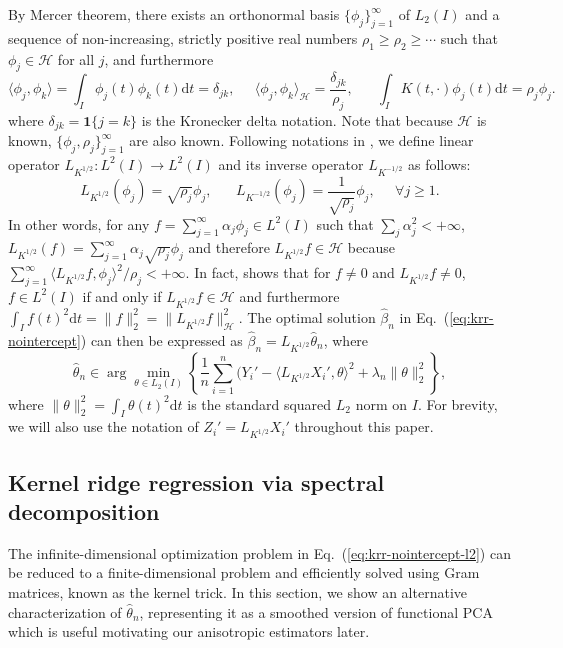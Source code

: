 \documentclass[11pt,a4paper]{article}
\renewcommand{\hat}{\widehat}
\newcommand{\vct}{\boldsymbol}
\theoremstyle{definition}
\theoremstyle{plain}
\theoremstyle{remark}
\newcommand{\ud}{\mathrm d}
\newcommand{\mH}{\mathcal H}
\begin{document}
By Mercer theorem, there exists an orthonormal basis $\{\phi_j\}_{j=1}^{\infty}$ of $L_2(I)$
and a sequence of non-increasing, strictly positive real numbers $\rho_1\geq\rho_2\geq\cdots$ such that $\phi_j\in\mH$ for all $j$, and furthermore
$$
\langle\phi_j,\phi_k\rangle = \int_I \phi_j(t)\phi_k(t)\ud t = \delta_{jk},\;\;\;\;\;\langle\phi_j,\phi_k\rangle_{\mH}= \frac{\delta_{jk}}{\rho_j},\;\;\;\;\;\;\int_I K(t,\cdot)\phi_j(t)\ud t=\rho_j\phi_j.
$$
where $\delta_{jk}=\vct 1\{j=k\}$ is the Kronecker delta notation.
Note that because $\mH$ is known, $\{\phi_j,\rho_j\}_{j=1}^{\infty}$ are also known.
Following notations in \citep{cai2012minimax}, we define linear operator $L_{K^{1/2}}:L^2(I)\to L^2(I)$ and its inverse operator $L_{K^{-1/2}}$ as follows:
$$
L_{K^{1/2}}(\phi_j) = \sqrt{\rho_j}\phi_j,\;\;\;\;\;\; L_{K^{-1/2}}(\phi_j) = \frac{1}{\sqrt{\rho_j}}\phi_j,\;\;\;\;\;\forall j\geq 1.
$$
In other words, for any $f=\sum_{j=1}^{\infty}\alpha_j\phi_j\in L^2(I)$ such that $\sum_j\alpha_j^2<+\infty$, $L_{K^{1/2}}(f)=\sum_{j=1}^{\infty}\alpha_j\sqrt{\rho_j}\phi_j$
and therefore $L_{K^{1/2}}f\in\mH$ because $\sum_{j=1}^{\infty}\langle L_{K^{1/2}}f,\phi_j\rangle^2/\rho_j <+\infty$.
In fact, \citep[Proposition 2]{yuan2010reproducing} shows that for $f\neq 0$ and $L_{K^{1/2}}f\neq 0$, $f\in L^2(I)$ if and only if $L_{K^{1/2}}f\in\mH$ and furthermore $\int_I f(t)^2\ud t=\|f\|_2^2=\|L_{K^{1/2}}f\|_\mH^2$.
The optimal solution $\hat\beta_n$ in Eq.~(\ref{eq:krr-nointercept}) can then be expressed as $\hat\beta_n = L_{K^{1/2}}\hat\theta_n$, where
\begin{equation}
\hat\theta_n \in \arg\min_{\theta\in L_2(I)}\left\{\frac{1}{n}\sum_{i=1}^n (Y_i'-\langle L_{K^{1/2}}X_i', \theta\rangle^2 + \lambda_n\|\theta\|_2^2\right\},
\label{eq:krr-nointercept-l2}
\end{equation}
where $\|\theta\|_2^2 =\int_I \theta(t)^2\ud t$ is the standard squared $L_2$ norm on $I$.
For brevity, we will also use the notation of $Z_i' = L_{K^{1/2}}X_i'$ throughout this paper.

\subsection{Kernel ridge regression via spectral decomposition}

The infinite-dimensional optimization problem in Eq.~(\ref{eq:krr-nointercept-l2}) can be reduced to a finite-dimensional problem and efficiently solved
using Gram matrices, known as the kernel trick. In this section, we show an alternative characterization of $\hat\theta_n$, representing it as a smoothed version of functional PCA
which is useful motivating our anisotropic estimators later.
\end{document}
